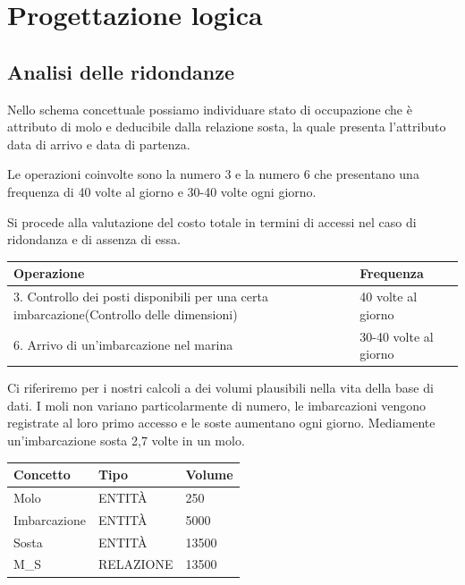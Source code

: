 \section{Progettazione logica}

\subsection{Analisi delle ridondanze}
Nello schema concettuale possiamo individuare stato di occupazione che è attributo di molo e deducibile dalla relazione sosta, la quale presenta l'attributo data di arrivo e data di partenza.

Le operazioni coinvolte sono la numero 3 e la numero 6 che presentano una frequenza di 40 volte al giorno e 30-40 volte ogni giorno.

Si procede alla valutazione del costo totale in termini di accessi nel caso di ridondanza e di assenza di essa.

\begin{center}
    \begin{tabularx}{\textwidth}{|p{90mm}|X|}
        \hline
        \rowcolor{gray!30}
        \textbf{Operazione} & \textbf{Frequenza}\\
        \hline
        3. Controllo dei posti disponibili per una certa imbarcazione(Controllo delle dimensioni)& 40 volte al giorno\\
        \hline
        6. Arrivo di un'imbarcazione nel marina & 30-40 volte al giorno\\
        \hline
    \end{tabularx}
\end{center}

Ci riferiremo per i nostri calcoli a dei volumi plausibili nella vita della base di dati. I moli non variano particolarmente di numero, le imbarcazioni vengono registrate al loro primo accesso e le soste aumentano ogni giorno. Mediamente un'imbarcazione sosta 2,7 volte in un molo.

\begin{center}
    \begin{tabularx}{\textwidth}{|X|X|X|}
        \hline
        \rowcolor{gray!30}
        \textbf{Concetto} & \textbf{Tipo} & \textbf{Volume}\\
        \hline
        Molo & ENTITÀ & 250\\
        \hline
        Imbarcazione & ENTITÀ & 5000\\
        \hline
        Sosta & ENTITÀ & 13500\\ %
        \hline
        M\_S & RELAZIONE & 13500\\ %
        \hline
    \end{tabularx}
\end{center}

